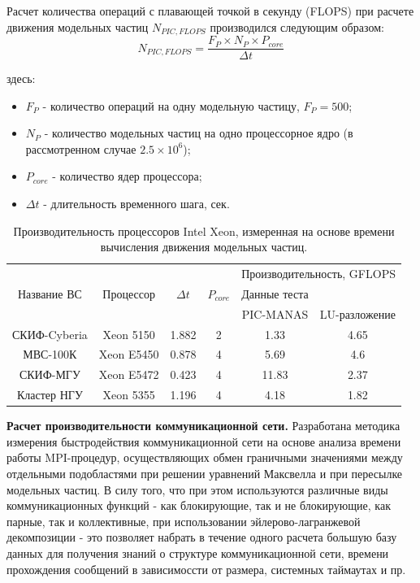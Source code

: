 Расчет количества операций с плавающей точкой в секунду (FLOPS) при расчете движения модельных частиц $N_{PIC,FLOPS}$ производился следующим образом:
\begin{equation}
N_{PIC,FLOPS} = \frac{F_P\times N_P \times P_{core}}{\Delta t}
\label{PIC_FLOPS}
\end{equation}

здесь:
\begin{itemize}
	\item $F_P$ - количество операций на одну модельную частицу, $F_P = 500$;
	\item $N_P$ - количество модельных частиц на одно процессорное ядро (в рассмотренном случае $2.5\times 10^6$);  
	\item $P_{core}$ - количество ядер процессора;
	\item $\Delta t$  - длительность временного шага, сек.
\end{itemize}	

\begin{table}[ht]
	\caption{Производительность процессоров Intel Xeon, измеренная на основе времени вычисления движения модельных частиц.}
	\label{PIC_vs_PROC_RAM}
	\begin{tabular}{|c|c|c|c|c|c|}
		\hline
		&            &            &             &       \multicolumn{2}{|c|}{Производительность, GFLOPS} \\ \cline{5-6}  	
		Название ВС  & Процессор  &  $\Delta t$ &$P_{core}$ & Данные теста  &  \\
		&            &             &           & PIC-MANAS     & LU-разложение \\ \hline
		СКИФ-Cyberia & Xeon 5150  &  1.882      & 2     &  1.33          & 4.65    \\ \hline
		МВС-100К     & Xeon E5450 &  0.878      & 4     & 5.69           & 4.6     \\ \hline 
		СКИФ-МГУ     & Xeon E5472 &  0.423      & 4     & 11.83          & 2.37       \\ \hline     
		Кластер НГУ  & Xeon 5355  &  1.196      & 4     & 4.18           & 1.82       \\ \hline
	\end{tabular}	
\end{table}



\clearpage

\textbf{Расчет производительности коммуникационной сети.}
Разработана методика измерения быстродействия коммуникационной сети на основе анализа времени работы MPI-процедур, осуществляющих обмен граничными значениями между отдельными подобластями при решении уравнений Максвелла и при пересылке модельных частиц. В силу того, что при этом используются различные виды коммуникационных функций  - как блокирующие, так и не блокирующие, как парные, так и коллективные, при использовании эйлерово-лагранжевой декомпозиции - это позволяет набрать в течение одного расчета большую базу данных для получения знаний о структуре коммуникационной сети, времени прохождения сообщений в зависимоссти от размера, системных таймаутах и пр. 

